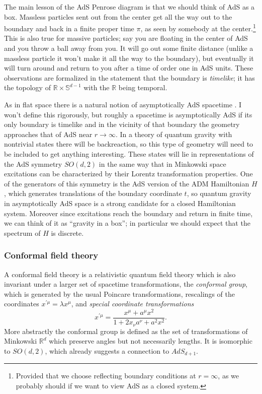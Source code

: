 \documentclass[12pt]{article}
\newcommand{\be}{\begin{equation}}
\newcommand{\ee}{\end{equation}}
\begin{document}
The main lesson of the AdS Penrose diagram is that we should think of AdS as a box. Massless particles sent out from the center get all the way out to the boundary and back in a finite proper time $\pi$, as seen by somebody at the center.\footnote{Provided that we choose reflecting boundary conditions at $r=\infty$, as we probably should if we want to view AdS as a closed system.}  This is also true for massive particles; say you are floating in the center of AdS and you throw a ball away from you.  It will go out some finite distance (unlike a massless particle it won't make it all the way to the boundary), but eventually it will turn around and return to you after a time of order one in AdS units.  These observations are formalized in the statement that the boundary is \textit{timelike}; it has the topology of $\mathbb{R}\times\mathbb{S}^{d-1}$ with the $\mathbb{R}$ being temporal.   

As in flat space there is a natural notion of asymptotically AdS spacetime  \cite{Henneaux:1985tv}.  I won't define this rigorously, but roughly a spacetime is asymptotically AdS if its only boundary is timelike and in the vicinity of that boundary the geometry approaches that of AdS near $r\to \infty$.  In a theory of quantum gravity with nontrivial states there will be backreaction, so this type of geometry will need to be included to get anything interesting.  These states will lie in representations of the AdS symmetry $SO(d,2)$ in the same way that in Minkowski space excitations can be characterized by their Lorentz transformation properties. One of the generators of this symmetry is the AdS version of the ADM Hamiltonian $H$, which generates translations of the boundary coordinate $t$, so quantum gravity in asymptotically AdS space is a strong candidate for a closed Hamiltonian system.  Moreover since excitations reach the boundary and return in finite time, we can think of it as ``gravity in a box''; in particular we should expect that the spectrum of $H$ is discrete.
  
\subsubsection{Conformal field theory}
A conformal field theory is a relativistic quantum field theory which is also invariant under a larger set of spacetime transformations, the \textit{conformal group}, which is generated by the usual Poincare transformations, rescalings of the coordinates $x^{'\mu}=\lambda x^\mu$, and \textit{special coordinate transformations}
\be
x^{'\mu}=\frac{x^\mu+a^\mu x^2}{1+2x_\nu a^\nu+a^2 x^2}.
\ee
More abstractly the conformal group is defined as the set of transformations of Minkowski $\mathbb{R}^{d}$ which preserve angles but not necessarily lengths.  It is isomorphic to $SO(d,2)$, which already suggests a connection to $AdS_{d+1}$.    
\end{document}

